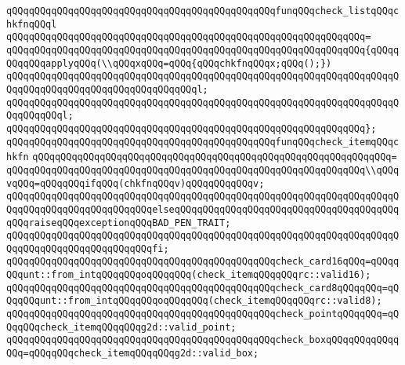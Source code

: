 \newline
\newline
\verb|qQQqqQQqqQQqqQQqqQQqqQQqqQQqqQQqqQQqqQQqqQQqqQQqfunqQQqcheck_listqQQqchkfnqQQql|\newline
\verb|qQQqqQQqqQQqqQQqqQQqqQQqqQQqqQQqqQQqqQQqqQQqqQQqqQQqqQQqqQQqqQQq=|\newline
\verb|qQQqqQQqqQQqqQQqqQQqqQQqqQQqqQQqqQQqqQQqqQQqqQQqqQQqqQQqqQQqqQQq{qQQqqQQqqQQqapplyqQQq(\\qQQqxqQQq=qQQq{qQQqchkfnqQQqx;qQQq();})|\newline
\verb|qQQqqQQqqQQqqQQqqQQqqQQqqQQqqQQqqQQqqQQqqQQqqQQqqQQqqQQqqQQqqQQqqQQqqQQqqQQqqQQqqQQqqQQqqQQqqQQqqQQqqQQql;|\newline
\verb|qQQqqQQqqQQqqQQqqQQqqQQqqQQqqQQqqQQqqQQqqQQqqQQqqQQqqQQqqQQqqQQqqQQqqQQqqQQqqQQql;|\newline
\verb|qQQqqQQqqQQqqQQqqQQqqQQqqQQqqQQqqQQqqQQqqQQqqQQqqQQqqQQqqQQqqQQq};|\newline
\newline
\verb|qQQqqQQqqQQqqQQqqQQqqQQqqQQqqQQqqQQqqQQqqQQqqQQqfunqQQqcheck_itemqQQqchkfn|\newline
\verb|qQQqqQQqqQQqqQQqqQQqqQQqqQQqqQQqqQQqqQQqqQQqqQQqqQQqqQQqqQQqqQQq=|\newline
\verb|qQQqqQQqqQQqqQQqqQQqqQQqqQQqqQQqqQQqqQQqqQQqqQQqqQQqqQQqqQQqqQQq\\qQQqvqQQq=qQQqqQQqifqQQq(chkfnqQQqv)qQQqqQQqqQQqv;|\newline
\verb|qQQqqQQqqQQqqQQqqQQqqQQqqQQqqQQqqQQqqQQqqQQqqQQqqQQqqQQqqQQqqQQqqQQqqQQqqQQqqQQqqQQqqQQqqQQqqQQqelseqQQqqQQqqQQqqQQqqQQqqQQqqQQqqQQqqQQqqQQqqQQqraiseqQQqexceptionqQQqBAD_PEN_TRAIT;|\newline
\verb|qQQqqQQqqQQqqQQqqQQqqQQqqQQqqQQqqQQqqQQqqQQqqQQqqQQqqQQqqQQqqQQqqQQqqQQqqQQqqQQqqQQqqQQqqQQqqQQqfi;|\newline
\newline
\verb|qQQqqQQqqQQqqQQqqQQqqQQqqQQqqQQqqQQqqQQqqQQqqQQqcheck_card16qQQq=qQQqqQQqunt::from_intqQQqqQQqoqQQqqQQq(check_itemqQQqqQQqrc::valid16);|\newline
\verb|qQQqqQQqqQQqqQQqqQQqqQQqqQQqqQQqqQQqqQQqqQQqqQQqcheck_card8qQQqqQQq=qQQqqQQqunt::from_intqQQqqQQqoqQQqqQQq(check_itemqQQqqQQqrc::valid8);|\newline
\newline
\verb|qQQqqQQqqQQqqQQqqQQqqQQqqQQqqQQqqQQqqQQqqQQqqQQqcheck_pointqQQqqQQq=qQQqqQQqcheck_itemqQQqqQQqg2d::valid_point;|\newline
\verb|qQQqqQQqqQQqqQQqqQQqqQQqqQQqqQQqqQQqqQQqqQQqqQQqcheck_boxqQQqqQQqqQQqqQQq=qQQqqQQqcheck_itemqQQqqQQqg2d::valid_box;|\newline
